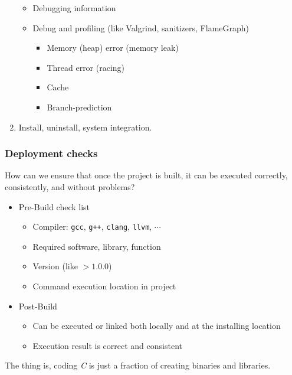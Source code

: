 \begin{frame}
\begin{enumerate}
\begin{itemize}
                \item \scriptsize Debugging information
                \item \scriptsize Debug and profiling (like Valgrind, sanitizers, FlameGraph)
                    \begin{itemize}
                        \item \tiny Memory (heap) error (memory leak)
                        \item \tiny Thread error (racing)
                        \item \tiny Cache
                        \item \tiny Branch-prediction
                    \end{itemize}
            \end{itemize}
        \item \footnotesize Install, uninstall, system integration.
    \end{enumerate}
\end{frame}

\begin{frame}
    \frametitle{Deployment checks}

    How can we ensure that once the project is built, it can be executed correctly, consistently, and without problems?

    \begin{itemize}
        \item Pre-Build check list
            \begin{itemize}
                \item Compiler: \texttt{gcc}, \texttt{g++}, \texttt{clang}, \texttt{llvm}, $\cdots$
                \item Required software, library, function
                \item Version (like $>1.0.0$)
                \item Command execution location in project
            \end{itemize}
        \item Post-Build
            \begin{itemize}
                \item Can be executed or linked both locally and at the installing location
                \item Execution result is correct and consistent
            \end{itemize}
    \end{itemize}

    The thing is, coding \textit{C} is just a fraction of creating binaries and libraries.
\end{frame}

